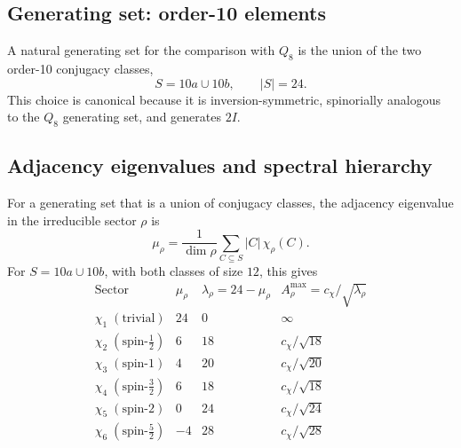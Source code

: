 \documentclass[11pt,a4paper]{article}
\begin{document}
    \subsection{Generating set: order-10 elements}
      \label{sec:step5-genset}

      A natural generating set for the comparison with $Q_8$ is the union of
      the two order-10 conjugacy classes,
      \begin{equation}
        S = 10a \cup 10b,
        \qquad
        |S| = 24.
        \label{eq:S-2I}
      \end{equation}
      This choice is canonical because it is inversion-symmetric, spinorially
      analogous to the $Q_8$ generating set, and generates $2I$.

    \subsection{Adjacency eigenvalues and spectral hierarchy}
      \label{sec:step5-spectrum}

      For a generating set that is a union of conjugacy classes, the adjacency
      eigenvalue in the irreducible sector $\rho$ is
      \begin{equation}
        \mu_\rho
        = \frac{1}{\dim\rho}
        \sum_{C \subseteq S} |C|\,\chi_\rho(C).
        \label{eq:mu-formula-2I}
      \end{equation}
      For $S = 10a \cup 10b$, with both classes of size $12$, this gives
      \begin{equation}
        \renewcommand{\arraystretch}{1.4}
        \begin{array}{l|ccc}
          \text{Sector} &
          \mu_\rho &
          \lambda_\rho = 24 - \mu_\rho &
          A^{\max}_\rho = c_\chi/\sqrt{\lambda_\rho} \\
          \hline
          \chi_1\;(\text{trivial}) & 24 & 0  & \infty \\
          \chi_2\;(\text{spin-}{\tfrac{1}{2}}) & 6  & 18 & c_\chi/\sqrt{18} \\
          \chi_3\;(\text{spin-}1) & 4  & 20 & c_\chi/\sqrt{20} \\
          \chi_4\;(\text{spin-}{\tfrac{3}{2}}) & 6  & 18 & c_\chi/\sqrt{18} \\
          \chi_5\;(\text{spin-}2) & 0  & 24 & c_\chi/\sqrt{24} \\
          \chi_6\;(\text{spin-}{\tfrac{5}{2}}) & -4 & 28 & c_\chi/\sqrt{28}
        \end{array}
        \label{eq:2I-spectrum}
      \end{equation}
\end{document}
